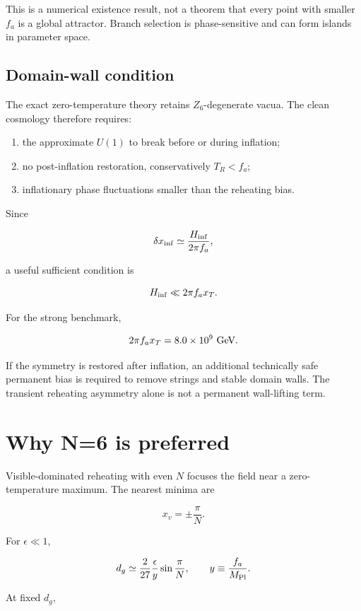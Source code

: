 \documentclass[
  10pt,
]{article}
\providecommand{\tightlist}{%
  \setlength{\itemsep}{0pt}\setlength{\parskip}{0pt}}
\begin{document}
This is a numerical existence result, not a theorem that every point
with smaller \(f_a\) is a global attractor. Branch selection is
phase-sensitive and can form islands in parameter space.

\subsection{Domain-wall condition}\label{domain-wall-condition}

The exact zero-temperature theory retains \(Z_6\)-degenerate vacua. The
clean cosmology therefore requires:

\begin{enumerate}
\def\labelenumi{\arabic{enumi}.}
\tightlist
\item
  the approximate \(U(1)\) to break before or during inflation;
\item
  no post-inflation restoration, conservatively \(T_R<f_a\);
\item
  inflationary phase fluctuations smaller than the reheating bias.
\end{enumerate}

Since

\[
\delta x_{\rm inf}\simeq\frac{H_{\rm inf}}{2\pi f_a},
\]

a useful sufficient condition is

\[
H_{\rm inf}\ll2\pi f_a x_T.
\]

For the strong benchmark,

\[
2\pi f_ax_T=8.0\times10^9\ {\rm GeV}.
\]

If the symmetry is restored after inflation, an additional technically
safe permanent bias is required to remove strings and stable domain
walls. The transient reheating asymmetry alone is not a permanent
wall-lifting term.

\section{Why N=6 is preferred}\label{why-n6-is-preferred}

Visible-dominated reheating with even \(N\) focuses the field near a
zero-temperature maximum. The nearest minima are

\[
x_v=\pm\frac{\pi}{N}.
\]

For \(\epsilon\ll1\),

\[
d_g\simeq
\frac{2}{27}\frac{\epsilon}{y}
\sin\frac{\pi}{N},
\qquad y\equiv\frac{f_a}{M_{\rm Pl}}.
\]

At fixed \(d_g\),
\end{document}
